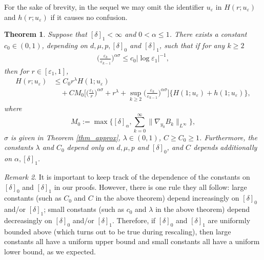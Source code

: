 \documentclass[reqno,12pt]{amsart} %
\newtheorem{theorem}{Theorem}[section]
\theoremstyle{definition}
\theoremstyle{remark}
\newtheorem{remark}[theorem]{Remark}
\numberwithin{equation}{section}
\newcommand{\jz}[1]{\textcolor{red}{#1}}
\begin{document}
For the sake of brevity, in the sequel we may omit the identifier $u_\varepsilon$ in $H(r; u_\varepsilon)$ and $h(r; u_\varepsilon)$ if it causes  no confusion.

\begin{theorem}\label{thm_Lip_1step}
  Suppose that $[\delta]_1<\infty$ and $0<\alpha\leq 1$. There exists a constant $c_0 \in (0, 1)$, depending on $d, \mu, p, [\delta]_0 $ and $[\delta]_1$, such that if for any $k\geq 2$
  \begin{align}\label{cond_logseparation}
    \bigg(\frac{\varepsilon_k}{\varepsilon_{k-1}}\bigg)^{\alpha\sigma}\leq c_0|\log \varepsilon_1|^{-1},
  \end{align}
then for $r\in[\varepsilon_1, 1]$,
  \begin{align*}
    H(r; u_\varepsilon) & \leq C_0 r^\lambda H(1; u_\varepsilon) \\
    & \quad +CM_0\bigg[\Big(\frac{\varepsilon_1}{r}\Big)^{\alpha\sigma}+r^\lambda+\sup_{k\geq 2}\bigg(\frac{\varepsilon_k}{\varepsilon_{k-1}}\bigg)^{\alpha\sigma}\bigg]\Big\{H(1; u_\varepsilon)+h(1; u_\varepsilon)\Big\},
  \end{align*}
  where 
  \begin{equation}\label{def.M0}
      M_0:= \max\bigg\{[\delta]_\alpha, {\sum_{k=0}^\infty \|\nabla_{y_0}B_k\|_{L^\infty}}\bigg\},
  \end{equation}
  $\sigma$ is given in Theorem \ref{thm_approx}, $\lambda\in(0, 1)$, $C\geq C_0\geq 1$. Furthermore, the constants $\lambda $ and $C_0$ depend only on $d, \mu, p$ and $[\delta]_0$, and $C$ depends additionally on $\alpha, [\delta]_1$. 
\end{theorem}

\begin{remark}
    {It is important to keep track of the dependence of the constants on $[\delta]_0$ and $[\delta]_1$ in our proofs. However, there is one rule they all follow: large constants (such as $C_0$ and $C$ in the above theorem) depend increasingly on $[\delta]_0$ and/or $[\delta]_1$; small constants (such as $c_0$ and $\lambda$ in the above theorem) depend decreasingly on $[\delta]_0$ and/or $[\delta]_1$. Therefore, if $[\delta]_0$ and $[\delta]_1$ are uniformly bounded above (which turns out to be true during rescaling), then large constants all have a uniform upper bound and small constants all have a uniform lower bound, as we expected.}
\end{remark}
\end{document}
